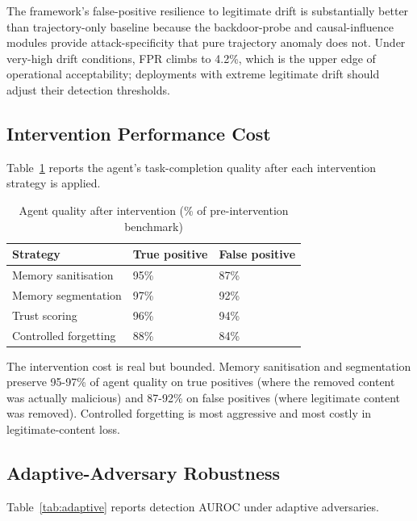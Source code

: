 \documentclass[sigconf,nonacm]{acmart}
\begin{document}
The framework's false-positive resilience to legitimate drift is
substantially better than trajectory-only baseline because the
backdoor-probe and causal-influence modules provide
attack-specificity that pure trajectory anomaly does not. Under
very-high drift conditions, FPR climbs to 4.2\%, which is the upper
edge of operational acceptability; deployments with extreme
legitimate drift should adjust their detection thresholds.

\subsection{Intervention Performance Cost}

Table~\ref{tab:interventioncost} reports the agent's task-completion
quality after each intervention strategy is applied.

\begin{table}[h]
\caption{Agent quality after intervention (\% of pre-intervention
benchmark)}
\label{tab:interventioncost}
\small
\begin{tabularx}{\columnwidth}{@{}p{3.0cm}X X@{}}
\toprule
\textbf{Strategy} & \textbf{True positive} & \textbf{False positive} \\
\midrule
Memory sanitisation   & 95\% & 87\% \\
Memory segmentation   & 97\% & 92\% \\
Trust scoring         & 96\% & 94\% \\
Controlled forgetting & 88\% & 84\% \\
\bottomrule
\end{tabularx}
\end{table}

The intervention cost is real but bounded. Memory sanitisation and
segmentation preserve 95-97\% of agent quality on true positives
(where the removed content was actually malicious) and 87-92\% on
false positives (where legitimate content was removed). Controlled
forgetting is most aggressive and most costly in legitimate-content
loss.

\subsection{Adaptive-Adversary Robustness}

Table~\ref{tab:adaptive} reports detection AUROC under adaptive
adversaries.
\end{document}
